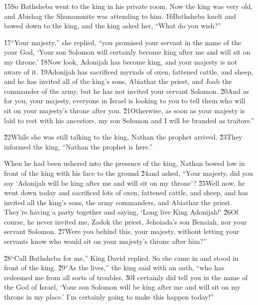 \v{15}So Bathsheba went to the king in his private room. Now the king was very old, and Abishag the Shunammite was attending to him. \v{16}Bathsheba knelt and bowed down to the king, and the king asked her, ``What do you wish?''

\v{17}``Your majesty,'' she replied, ``you promised your servant in the name of the  your God, `Your son Solomon will certainly become king after me and will sit on my throne.' \v{18}Now look, Adonijah has become king, and your majesty is not aware of it. \v{19}Adonijah has sacrificed myriads of oxen, fattened cattle, and sheep, and he has invited all of the king's sons, Abiathar the priest, and Joab the commander of the army, but he has not invited your servant Solomon. \v{20}And as for you, your majesty, everyone in Israel is looking to you to tell them who will sit on your majesty's throne after you. \v{21}Otherwise, as soon as your majesty is laid to rest with his ancestors, my son Solomon and I will be branded as traitors.''

\v{22}While she was still talking to the king, Nathan the prophet arrived. \v{23}They informed the king, ``Nathan the prophet is here.''

When he had been ushered into the presence of the king, Nathan bowed low in front of the king with his face to the ground \v{24}and asked, ``Your majesty, did you say `Adonijah will be king after me and will sit on my throne'? \v{25}Well now, he went down today and sacrificed lots of oxen, fattened cattle, and sheep, and has invited all the king's sons, the army commanders, and Abiathar the priest. They're having a party together and saying, `Long live King Adonijah!' \v{26}Of course, he never invited me, Zadok the priest, Jehoiada's son Benaiah, nor your servant Solomon. \v{27}Were you behind this, your majesty, without letting your servants know who would sit on your majesty's throne after him?''

\v{28}``Call Bathsheba for me,'' King David replied. So she came in and stood in front of the king. \v{29}``As the  lives,'' the king said with an oath, ``who has redeemed me from all sorts of troubles, \v{30}I certainly did tell you in the name of the  God of Israel, `Your son Solomon will be king after me and will sit on my throne in my place.' I'm certainly going to make this happen today!''

